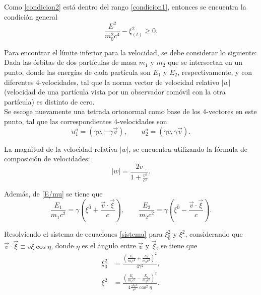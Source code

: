 Como \eqref{condicion2} est\'a dentro del rango \eqref{condicion1}, entonces se encuentra la condici\'on general
\begin{equation}
\frac{E^{2}}{m_0^2c^4}-\xi_{(t)}^2 \geq 0.
\end{equation}

Para encontrar el l\'imite inferior para la velocidad, se debe considerar lo siguiente: Dada las \'orbitas de dos part\'iculas de masa $m_1$ y $m_2$ que se intersectan en un punto, donde las energ\'ias de cada part\'icula son $E_1$ y $E_2$, respectivamente, y con diferentes 4-velocidades, tal que la norma vector de velocidad relativo $|w|$ (velocidad de una part\'icula vista por un observador com\'ovil con la otra part\'icula) es distinto de cero.\\

Se escoge nuevamente una tetrada ortonormal como base de los 4-vectores en este punto, tal que las correspondientes 4-velocidades son
\begin{equation}
u_1^{a}=\left(\gamma c, -\gamma \vec{v} \right), \qquad u_2^{a}=\left(\gamma c, \gamma \vec{v}\right).
\end{equation}

La magnitud de la velocidad relativa $|w|$, se encuentra utilizando la f\'ormula de composici\'on de velocidades:
\begin{equation}\label{w}
|w|=\frac{2v}{1+\frac{v^2}{c^2}}.
\end{equation}

Adem\'as, de \eqref{E/mu} se tiene que
\begin{equation}\label{sistema}
\frac{E_1}{m_1c^2}=\gamma\left(\xi^{\hat{0}}+\frac{\vec{v} \cdot \vec{\xi}}{c} \right), \qquad \frac{E_2}{m_2c^2}=\gamma\left(\xi^{\hat{0}}-\frac{\vec{v} \cdot \vec{\xi}}{c} \right).
\end{equation}

Resolviendo el sistema de ecuaciones \eqref{sistema} para $\xi_{\hat{0}}^2$ y $\xi^2$, considerando que $\vec{v}\cdot \vec{\xi} \equiv v\xi \cos \eta$, donde $\eta$ es el \'angulo entre $\vec{v}$ y $\vec{\xi}$, se tiene que
\begin{equation}
\begin{aligned}
\xi_{\hat{0}}^2&=\frac{\left(\frac{E_1}{m_1c^2}+\frac{E_2}{m_2c^2} \right)^2}{4\gamma ^2},\\
\xi^2&=\frac{\left(\frac{E_1}{m_1c^2}-\frac{E_2}{m_2c^2} \right)^2}{4\frac{\gamma ^2 v^2}{c^2}\cos^2 \eta}. \\
\end{aligned}
\end{equation}

